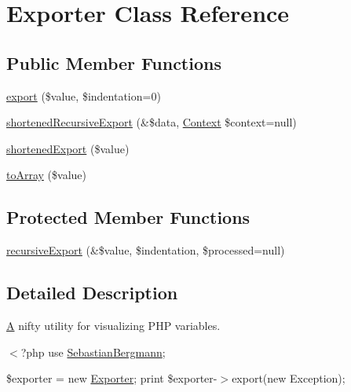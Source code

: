 \hypertarget{class_sebastian_bergmann_1_1_exporter_1_1_exporter}{}\section{Exporter Class Reference}
\label{class_sebastian_bergmann_1_1_exporter_1_1_exporter}
\subsection*{Public Member Functions}
\begin{DoxyCompactItemize}
\item 
\mbox{\hyperlink{class_sebastian_bergmann_1_1_exporter_1_1_exporter_ac3e08a7045a8606223a3128f3899699f}{export}} (\$value, \$indentation=0)
\item 
\mbox{\hyperlink{class_sebastian_bergmann_1_1_exporter_1_1_exporter_a71bd2afaec2a3909f983b6c29743799e}{shortened\+Recursive\+Export}} (\&\$data, \mbox{\hyperlink{class_sebastian_bergmann_1_1_recursion_context_1_1_context}{Context}} \$context=null)
\item 
\mbox{\hyperlink{class_sebastian_bergmann_1_1_exporter_1_1_exporter_a2b6cd7fb6130ef59e058429cdcca5bd2}{shortened\+Export}} (\$value)
\item 
\mbox{\hyperlink{class_sebastian_bergmann_1_1_exporter_1_1_exporter_a1b9658938175cf37957b35a782722c7b}{to\+Array}} (\$value)
\end{DoxyCompactItemize}
\subsection*{Protected Member Functions}
\begin{DoxyCompactItemize}
\item 
\mbox{\hyperlink{class_sebastian_bergmann_1_1_exporter_1_1_exporter_ade8d29867a8fc30d9bcf00f67a165e70}{recursive\+Export}} (\&\$value, \$indentation, \$processed=null)
\end{DoxyCompactItemize}


\subsection{Detailed Description}
\mbox{\hyperlink{class_a}{A}} nifty utility for visualizing P\+HP variables.

{\ttfamily  $<$?php use \mbox{\hyperlink{namespace_sebastian_bergmann}{Sebastian\+Bergmann}};}

{\ttfamily \$exporter = new \mbox{\hyperlink{class_sebastian_bergmann_1_1_exporter_1_1_exporter}{Exporter}}; print \$exporter-\/$>$export(new Exception); } 

